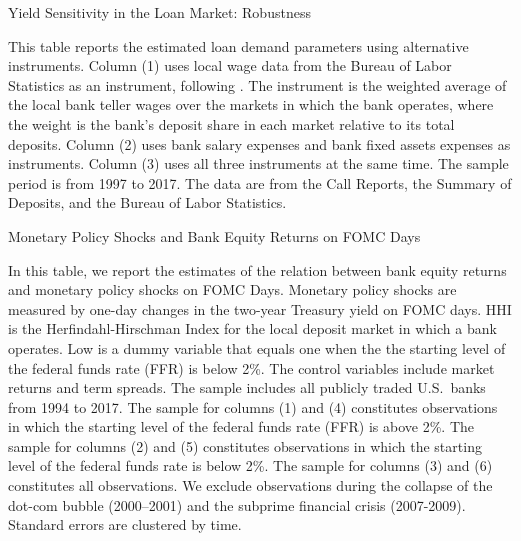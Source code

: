 \documentclass[12pt]{article}
\begin{document}
 
 \newpage
 \begin{table}[h]
 	\caption{Yield Sensitivity in the Loan Market: Robustness \label{tab:demand_estimation_wage_loan_1997_2017}}
 	\vspace{5mm}
 	
 	\vspace{5mm}
 	
 	\small{This table reports the estimated loan demand parameters using alternative instruments. Column (1) uses local wage data from the Bureau of Labor Statistics as an instrument, following \cite{Dick2008}. The instrument is   the weighted average of the local bank teller wages over the markets in which the bank operates, where the weight is the bank's deposit share in each market relative to its total deposits. Column (2) uses bank salary expenses and bank fixed assets expenses as instruments. Column (3) uses all  three instruments at the same time.  The sample period is from 1997 to 2017. The data are from the Call Reports, the Summary of Deposits, and the Bureau of Labor Statistics.}
 \end{table}
 


 

\clearpage
\newpage
\begin{table} 
	\caption{Monetary Policy Shocks and Bank Equity Returns on FOMC Days  \label{tab:stock_return_on_FOMC_days_r1}}
	\vspace{5mm}
	\footnotesize{\noindent In this table, we report the estimates of the relation  between bank equity returns and monetary policy shocks  on FOMC Days. Monetary policy shocks are measured by one-day changes in the two-year Treasury yield on FOMC days. HHI is the Herfindahl-Hirschman Index for the local deposit market in which a bank operates. Low is a dummy variable that equals one when the the starting level of the federal funds rate (FFR) is below 2\%. The control variables include market returns and term spreads. The sample includes all publicly traded U.S.\ banks from 1994 to 2017. The sample for columns (1) and (4) constitutes observations in which the starting level of the federal funds rate (FFR) is above 2\%. The sample for columns (2) and (5) constitutes observations in which the starting level of the federal funds rate is below 2\%.  The sample for columns (3) and (6) constitutes all observations.  We exclude observations during the collapse of the dot-com bubble (2000--2001) and the subprime financial crisis (2007-2009). Standard errors are clustered by time. \\}
	
	
\end{table}
\end{document}
